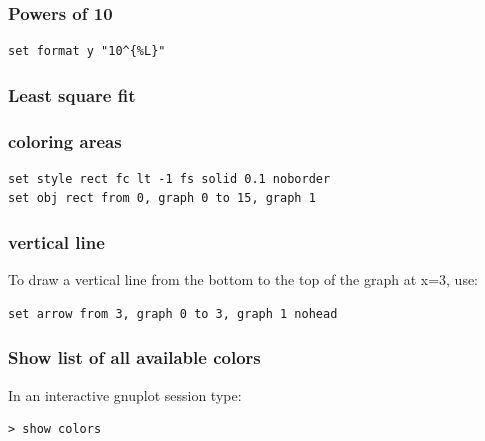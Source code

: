 \subsubsection*{Powers of 10}

\begin{verbatim}
set format y "10^{%L}"
\end{verbatim}


\subsubsection*{Least square fit}


\subsubsection*{coloring areas}


\begin{verbatim}
set style rect fc lt -1 fs solid 0.1 noborder
set obj rect from 0, graph 0 to 15, graph 1
\end{verbatim}


\subsubsection*{vertical line}

To draw a vertical line from the bottom to the top of the graph at x=3, use: 
\begin{verbatim}
set arrow from 3, graph 0 to 3, graph 1 nohead
\end{verbatim}


\subsubsection*{Show list of all available colors}

In an interactive gnuplot session type:

\begin{verbatim}
> show colors
\end{verbatim}




